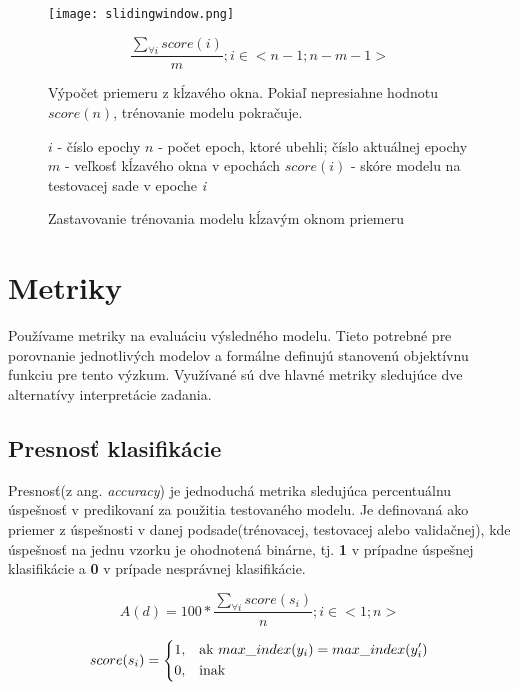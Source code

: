 \begin{figure}[H]
\begin{center}
\texttt{[image: slidingwindow.png]}\end{center}
\caption[slidingwindow.png]{Zastavovanie trénovania modelu kĺzavým oknom priemeru}
\label{fig:slidingwindow.png}
\medskip
\small
$$\frac{\sum_{\forall i}score(i)}{m}; i \in <n-1;n-m-1>$$\newline

Výpočet priemeru z kĺzavého okna. Pokiaľ nepresiahne hodnotu $score(n)$, trénovanie modelu pokračuje.\newline

$i$ - číslo epochy\newline
$n$ - počet epoch, ktoré ubehli; číslo aktuálnej epochy\newline
$m$ - veľkosť kĺzavého okna v epochách\newline
$score(i)$ - skóre modelu na testovacej sade v epoche \textit{i}\newline
\end{figure} 


\section{Metriky}
\label{metrics}

Používame metriky na evaluáciu výsledného modelu. Tieto potrebné pre porovnanie jednotlivých modelov a formálne definujú stanovenú objektívnu funkciu pre tento výzkum. Využívané sú dve hlavné metriky sledujúce dve alternatívy interpretácie zadania.

\subsection{Presnosť klasifikácie}
\label{simple_score}

Presnosť(z ang. \textit{accuracy}) je jednoduchá metrika sledujúca percentuálnu úspešnosť v predikovaní za použitia testovaného modelu. Je definovaná ako priemer z úspešnosti v danej podsade(trénovacej, testovacej alebo validačnej), kde úspešnosť na jednu vzorku je ohodnotená binárne, tj. \textbf{1} v prípadne úspešnej klasifikácie a \textbf{0} v prípade nesprávnej klasifikácie.

$$A(d) = 100*\frac{\sum_{\forall i}score(s_i)}{n}; i \in <1;n>$$

\[
    score(s_i)= 
\begin{dcases}
    1,& \text{ak } max\_index(y_i) = max\_index(y'_i)\\
    0,              & \text{inak}
\end{dcases}
\]


